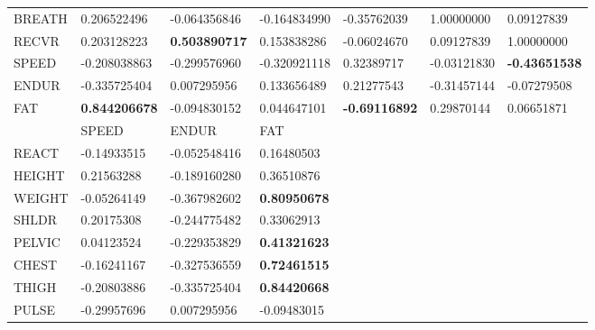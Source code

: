 \documentclass[10pt]{article}
\begin{document}
\begin{table}[H]
\begin{tabular}{lllllll}
BREATH & 0.206522496           & -0.064356846          & -0.164834990         & -0.35762039          & 1.00000000          & 0.09127839            \\
RECVR  & 0.203128223           & \textbf{0.503890717}  & 0.153838286          & -0.06024670          & 0.09127839          & 1.00000000            \\
SPEED  & -0.208038863          & -0.299576960          & -0.320921118         & 0.32389717           & -0.03121830         & \textbf{-0.43651538}  \\
ENDUR  & -0.335725404          & 0.007295956           & 0.133656489          & 0.21277543           & -0.31457144         & -0.07279508           \\
FAT    & \textbf{0.844206678}  & -0.094830152          & 0.044647101          & \textbf{-0.69116892} & 0.29870144          & 0.06651871            \\
       & SPEED                 & ENDUR                 & FAT                  &                      &                     &                       \\
REACT  & -0.14933515           & -0.052548416          & 0.16480503           &                      &                     &                       \\
HEIGHT & 0.21563288            & -0.189160280          & 0.36510876           &                      &                     &                       \\
WEIGHT & -0.05264149           & -0.367982602          & \textbf{0.80950678}  & \textbf{}            &                     &                       \\
SHLDR  & 0.20175308            & -0.244775482          & 0.33062913           &                      &                     &                       \\
PELVIC & 0.04123524            & -0.229353829          & \textbf{0.41321623}  & \textbf{}            &                     &                       \\
CHEST  & -0.16241167           & -0.327536559          & \textbf{0.72461515}  & \textbf{}            &                     &                       \\
THIGH  & -0.20803886           & -0.335725404          & \textbf{0.84420668}  & \textbf{}            &                     &                       \\
PULSE  & -0.29957696           & 0.007295956           & -0.09483015          &                      &                     &                       \\

\end{tabular}
\end{table}
\end{document}
